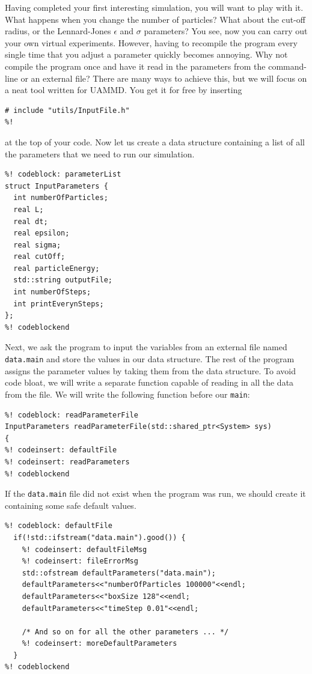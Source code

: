 Having completed your first interesting simulation, you will want to play with
it. What happens when you change the number of particles? What about the cut-off
radius, or the Lennard-Jones $\epsilon$ and $\sigma$ parameters? You see, now
you can carry out your own virtual experiments. However, having to recompile the
program every single time that you adjust a parameter quickly becomes annoying.
Why not compile the program once and have it read in the parameters from the
command-line or an external file? There are many ways to achieve this, but we
will focus on a neat tool written for UAMMD. You get it for free by inserting
\begin{lstlisting}
# include "utils/InputFile.h"
%!
\end{lstlisting}
at the top of your code. Now let us create a data structure containing a list of
all the parameters that we need to run our simulation.
\begin{lstlisting}
%! codeblock: parameterList
struct InputParameters {
  int numberOfParticles;
  real L;
  real dt;
  real epsilon;
  real sigma;
  real cutOff;
  real particleEnergy;
  std::string outputFile;
  int numberOfSteps;
  int printEverynSteps;
};
%! codeblockend
\end{lstlisting}
Next, we ask the program to input the variables from an external file named
\texttt{data.main} and store the values in our data structure. The rest of the
program assigns the parameter values by taking them from the data structure.
To avoid code bloat, we will write a separate function capable of reading in
all the data from the file. We will write the following function before our
\texttt{main}:
\begin{lstlisting}
%! codeblock: readParameterFile
InputParameters readParameterFile(std::shared_ptr<System> sys)
{
%! codeinsert: defaultFile
%! codeinsert: readParameters
%! codeblockend
\end{lstlisting}
If the \texttt{data.main} file did not exist when the program was run, we should
create it containing some safe default values.
\begin{lstlisting}
%! codeblock: defaultFile
  if(!std::ifstream("data.main").good()) {
    %! codeinsert: defaultFileMsg
    %! codeinsert: fileErrorMsg
    std::ofstream defaultParameters("data.main");
    defaultParameters<<"numberOfParticles 100000"<<endl;
    defaultParameters<<"boxSize 128"<<endl;
    defaultParameters<<"timeStep 0.01"<<endl;

    /* And so on for all the other parameters ... */
    %! codeinsert: moreDefaultParameters
  }
%! codeblockend
\end{lstlisting}
